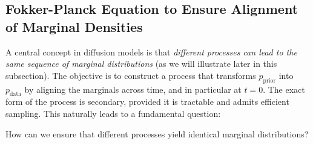 \subsection{Fokker-Planck Equation to Ensure Alignment of Marginal Densities}
A central concept in diffusion models is that \emph{different processes can lead to the same sequence of marginal distributions} (as we will illustrate later in this subsection).
 The objective is to construct a process that transforms $p_{\mathrm{prior}}$ into $p_{\mathrm{data}}$ by aligning the marginals across time, and in particular at $t=0$. The exact form of the process is secondary, provided it is tractable and admits efficient sampling. This naturally leads to a fundamental question:


\begin{question}
How can we ensure that different processes yield identical marginal distributions?
\end{question}



